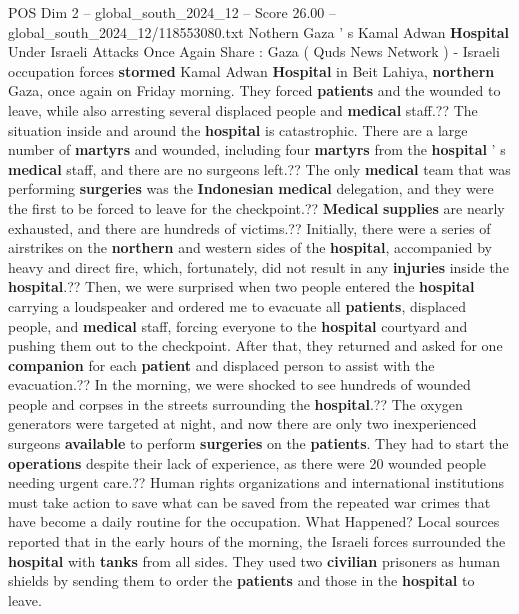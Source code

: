 \begin{textsample}{POS Dim 2 – global\_south\_2024\_12 – Score 26.00 – global\_south\_2024\_12/118553080.txt}  \label{ex:f2_pos_069}
Nothern Gaza ' s Kamal Adwan \textbf{Hospital} Under Israeli Attacks Once Again Share : Gaza ( Quds News Network ) - Israeli occupation forces \textbf{stormed} Kamal Adwan \textbf{Hospital} in Beit Lahiya, \textbf{northern} Gaza, once again on Friday morning.
They forced \textbf{patients} and the wounded to leave, while also arresting several displaced people and \textbf{medical} staff.??
The situation inside and around the \textbf{hospital} is catastrophic.
There are a large number of \textbf{martyrs} and wounded, including four \textbf{martyrs} from the \textbf{hospital} ' s \textbf{medical} staff, and there are no surgeons left.??
The only \textbf{medical} team that was performing \textbf{surgeries} was the \textbf{Indonesian} \textbf{medical} delegation, and they were the first to be forced to leave for the checkpoint.?? \textbf{Medical} \textbf{supplies} are nearly exhausted, and there are hundreds of victims.??
Initially, there were a series of airstrikes on the \textbf{northern} and western sides of the \textbf{hospital}, accompanied by heavy and direct fire, which, fortunately, did not result in any \textbf{injuries} inside the \textbf{hospital}.??
Then, we were surprised when two people entered the \textbf{hospital} carrying a loudspeaker and ordered me to evacuate all \textbf{patients}, displaced people, and \textbf{medical} staff, forcing everyone to the \textbf{hospital} courtyard and pushing them out to the checkpoint.
After that, they returned and asked for one \textbf{companion} for each \textbf{patient} and displaced person to assist with the evacuation.??
In the morning, we were shocked to see hundreds of wounded people and corpses in the streets surrounding the \textbf{hospital}.??
The oxygen generators were targeted at night, and now there are only two inexperienced surgeons \textbf{available} to perform \textbf{surgeries} on the \textbf{patients}.
They had to start the \textbf{operations} despite their lack of experience, as there were 20 wounded people needing urgent care.??
Human rights organizations and international institutions must take action to save what can be saved from the repeated war crimes that have become a daily routine for the occupation.
What Happened?
Local sources reported that in the early hours of the morning, the Israeli forces surrounded the \textbf{hospital} with \textbf{tanks} from all sides.
They used two \textbf{civilian} prisoners as human shields by sending them to order the \textbf{patients} and those in the \textbf{hospital} to leave.

\end{textsample}
